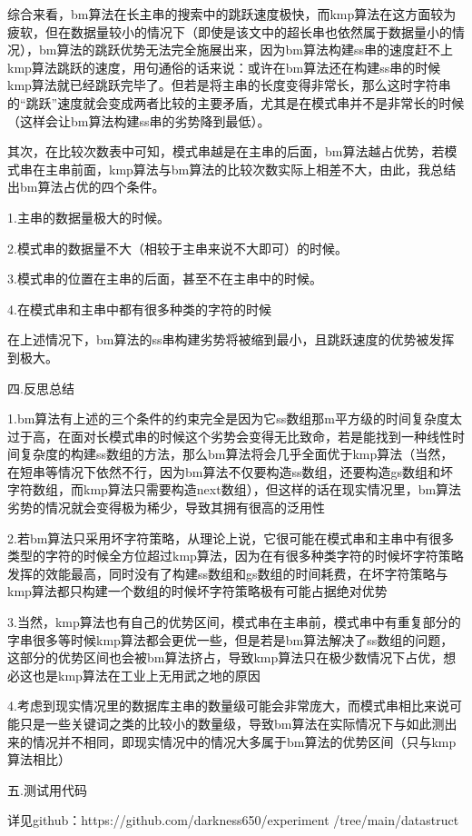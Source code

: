 \documentclass[12pt]{article}
\begin{document}
综合来看，bm算法在长主串的搜索中的跳跃速度极快，而kmp算法在这方面较为疲软，但在数据量较小的情况下（即使是该文中的超长串也依然属于数据量小的情况），bm算法的跳跃优势无法完全施展出来，因为bm算法构建ss串的速度赶不上kmp算法跳跃的速度，用句通俗的话来说：或许在bm算法还在构建ss串的时候kmp算法就已经跳跃完毕了。但若是将主串的长度变得非常长，那么这时字符串的“跳跃”速度就会变成两者比较的主要矛盾，尤其是在模式串并不是非常长的时候（这样会让bm算法构建ss串的劣势降到最低）。

其次，在比较次数表中可知，模式串越是在主串的后面，bm算法越占优势，若模式串在主串前面，kmp算法与bm算法的比较次数实际上相差不大，由此，我总结出bm算法占优的四个条件。

1.主串的数据量极大的时候。

2.模式串的数据量不大（相较于主串来说不大即可）的时候。

3.模式串的位置在主串的后面，甚至不在主串中的时候。

4.在模式串和主串中都有很多种类的字符的时候

在上述情况下，bm算法的ss串构建劣势将被缩到最小，且跳跃速度的优势被发挥到极大。

\begin{large}
	\noindent
	\heiti
	四.反思总结
\end{large}

1.bm算法有上述的三个条件的约束完全是因为它ss数组那m平方级的时间复杂度太过于高，在面对长模式串的时候这个劣势会变得无比致命，若是能找到一种线性时间复杂度的构建ss数组的方法，那么bm算法将会几乎全面优于kmp算法（当然，在短串等情况下依然不行，因为bm算法不仅要构造ss数组，还要构造gs数组和坏字符数组，而kmp算法只需要构造next数组），但这样的话在现实情况里，bm算法劣势的情况就会变得极为稀少，导致其拥有很高的泛用性

2.若bm算法只采用坏字符策略，从理论上说，它很可能在模式串和主串中有很多类型的字符的时候全方位超过kmp算法，因为在有很多种类字符的时候坏字符策略发挥的效能最高，同时没有了构建ss数组和gs数组的时间耗费，在坏字符策略与kmp算法都只构建一个数组的时候坏字符策略极有可能占据绝对优势

3.当然，kmp算法也有自己的优势区间，模式串在主串前，模式串中有重复部分的字串很多等时候kmp算法都会更优一些，但是若是bm算法解决了ss数组的问题，这部分的优势区间也会被bm算法挤占，导致kmp算法只在极少数情况下占优，想必这也是kmp算法在工业上无用武之地的原因

4.考虑到现实情况里的数据库主串的数量级可能会非常庞大，而模式串相比来说可能只是一些关键词之类的比较小的数量级，导致bm算法在实际情况下与如此测出来的情况并不相同，即现实情况中的情况大多属于bm算法的优势区间（只与kmp算法相比）

\begin{large}
	\noindent
	\heiti
	五.测试用代码
\end{large}

详见github：https://github.com/darkness650/experiment\newline
/tree/main/datastruct
\end{document}
